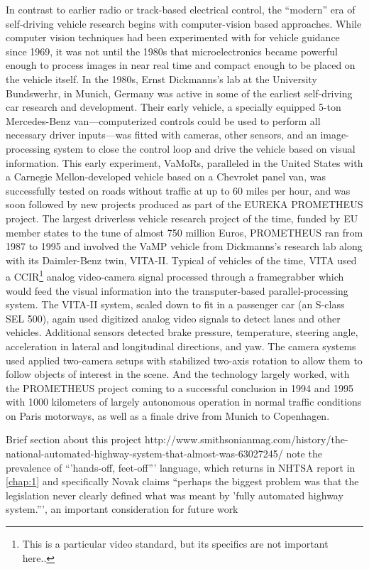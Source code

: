 In contrast to earlier radio or track-based electrical control, the
``modern'' era of self-driving vehicle research begins with
computer-vision based approaches. While computer vision techniques had
been experimented with for vehicle guidance since 1969, it was not
until the 1980s that microelectronics became powerful enough to
process images in near real time and compact enough to be placed on
the vehicle itself\cite{???}. In the 1980s, Ernst Dickmanns's lab at the
University Bundswerhr, in Munich, Germany was active in some of the
earliest self-driving car research and development\cite{???}. Their early
vehicle, a specially equipped 5-ton Mercedes-Benz van---computerized
controls could be used to perform all necessary driver inputs---was
fitted with cameras, other sensors, and an image-processing system to
close the control loop and drive the vehicle based on visual
information.\cite{???} This early experiment, VaMoRs, paralleled in the United
States with a Carnegie Mellon-developed vehicle based on a Chevrolet
panel van, was successfully tested on roads without traffic at up to
60 miles per hour,\cite{???} and was soon followed by new projects produced as
part of the EUREKA PROMETHEUS project\cite{???}. The largest driverless vehicle
research project of the time, funded by EU member states to the tune
of almost 750 million Euros, PROMETHEUS ran from 1987 to 1995 and
involved the VaMP vehicle from Dickmanns's research lab along with its
Daimler-Benz twin, VITA-II. Typical of vehicles of the time, VITA used
a CCIR\footnote{This is a particular video standard, but its specifics are
  not important here..} analog video-camera signal processed through a framegrabber
which would feed the visual information into the transputer-based
parallel-processing system\cite{???}. The VITA-II system, scaled down to fit in
a passenger car (an S-class SEL 500), again used digitized analog
video signals to detect lanes and other vehicles\cite{???}. Additional sensors
detected brake pressure, temperature, steering angle, acceleration in
lateral and longitudinal directions, and yaw\cite{???}. The camera systems used
applied two-camera setups with stabilized two-axis rotation to allow
them to follow objects of interest in the scene\cite{???}. And the
technology largely worked, with the PROMETHEUS project coming to a
successful conclusion in 1994 and 1995 with 1000 kilometers of largely
autonomous operation in normal traffic conditions on Paris motorways,
as well as a finale drive from Munich to Copenhagen\cite{???}.

Brief section about this project
http://www.smithsonianmag.com/history/the-national-automated-highway-system-that-almost-was-63027245/
note the prevalence of ``'hands-off, feet-off''' language, which
returns in NHTSA report in \ref{chap:1}
and specifically
Novak claims ``perhaps the biggest problem was that the legislation
never clearly defined what was meant by 'fully automated highway
system.''', an important consideration for future work




